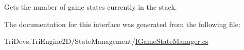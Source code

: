 Gets the number of game states currently in the stack. 



The documentation for this interface was generated from the following file\-:\begin{DoxyCompactItemize}
\item 
Tri\-Devs.\-Tri\-Engine2\-D/\-State\-Management/\hyperlink{_i_game_state_manager_8cs}{I\-Game\-State\-Manager.\-cs}\end{DoxyCompactItemize}
